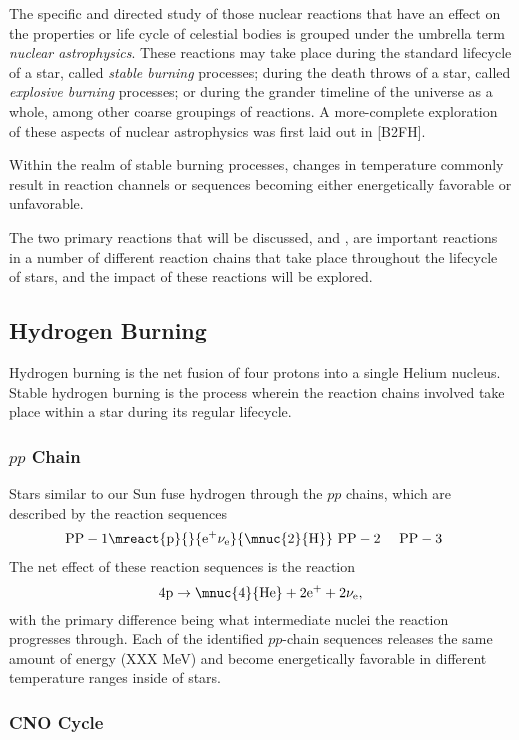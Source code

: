 The specific and directed study of those nuclear reactions that have an effect
on the properties or life cycle of celestial bodies is grouped under the
umbrella term \emph{nuclear astrophysics}. These reactions may take place
during the standard lifecycle of a star, called \emph{stable burning}
processes; during the death throws of a star, called \emph{explosive burning}
processes; or during the grander timeline of the universe as a whole, among
other coarse groupings of reactions. A more-complete exploration of these
aspects of nuclear astrophysics was first laid out in [B2FH].

Within the realm of stable burning processes, changes in temperature commonly
result in reaction channels or sequences becoming either energetically
favorable or unfavorable.

The two primary reactions that will
be discussed, \alpa{} and \nag{},
are important reactions in a number of different reaction chains that take
place throughout the lifecycle of stars, and the impact of these reactions will
be explored.

\subsection{Hydrogen Burning}

Hydrogen burning is the net fusion of four protons into a single Helium
nucleus. Stable hydrogen burning is the process wherein the reaction chains
involved take place within a star during its regular lifecycle.

\subsubsection{$pp$ Chain}

Stars similar to our Sun fuse hydrogen through the $pp$ chains, which are
described by the reaction sequences
\begin{align*}
    \rm{PP-1}& \mreact{\rm{p}}{\rm}{e^+\nu_e}{\mnuc{2}{H}} \
    \rm{PP-2}& \
    \rm{PP-3}&
\end{align*}
The net effect of these reaction sequences is the reaction
\[
    4\rm{p} \rightarrow \mnuc{4}{He} + 2e^+ + 2\nu_e,
\]
with the primary difference being what intermediate nuclei the reaction
progresses through. Each of the identified $pp$-chain sequences releases the
same amount of energy (XXX MeV) and become energetically favorable in different
temperature ranges inside of stars.

\subsubsection{CNO Cycle}

